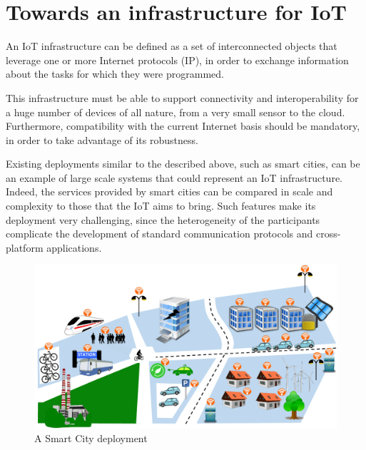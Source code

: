 \section{Towards an infrastructure for IoT}
\label{sec:IoTInfra}
An IoT infrastructure can be defined as a set of interconnected objects that leverage one or more Internet protocols (IP), in order to exchange information about the tasks for which they were programmed.

This infrastructure must be able to support connectivity and interoperability for a huge number of devices of all nature, from a very small sensor to the cloud.
Furthermore, compatibility with the current Internet basis should be mandatory, in order to take advantage of its robustness.

Existing deployments similar to the described above, such as smart cities, can be an example of large scale systems that could represent an IoT infrastructure.
Indeed, the services provided by smart cities can be compared in scale and complexity to those that the IoT aims to bring.
Such features make its deployment very challenging, since the heterogeneity of the participants complicate the development of standard communication protocols and cross-platform applications.

\begin{figure}[htb]
	\centering
	\includegraphics[width=1\columnwidth]{chapters/background.images/SmartCity_comm.pdf}
	\caption{A Smart City deployment}
	\label{fig:SmartCity}
\end{figure}

